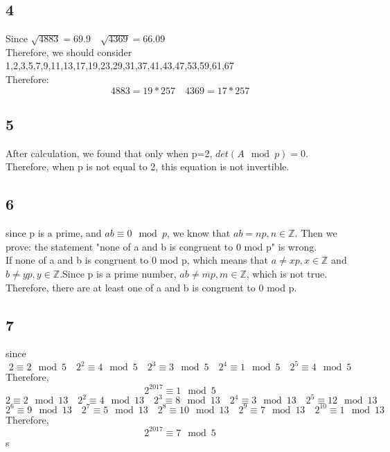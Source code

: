 \documentclass[a4paper,12pt]{journal}
\begin{document}
\subsection*{4}
Since $\sqrt{4883}=69.9\quad\sqrt{4369}=66.09$\\
Therefore, we should consider 1,2,3,5,7,9,11,13,17,19,23,29,31,37,41,43,47,53,59,61,67\\
Therefore:
$$4883=19*257\quad 4369=17*257$$
\subsection*{5}
After calculation, we found that only when p=2, $det(A\mod p)=0$. Therefore, when p is not equal to 2, this equation is not invertible.
\subsection*{6}
since p is a prime, and $ab\equiv 0 \mod p$, we know that $ab=np,n\in\mathbb{Z}$. Then we prove: the statement "none of a and b is congruent to 0 mod p" is wrong.\\
If none of a and b is congruent to 0 mod p, which means that $a\not =xp,x\in\mathbb{Z}$ and $b\not =yp,y\in\mathbb{Z}$.Since p is a prime number, $ab\not = mp,m\in\mathbb{Z}$, which is not true. Therefore, there are at least one of a and b is congruent to 0 mod p.\\
\subsection*{7}
since
$$2\equiv 2\mod 5\quad2^2\equiv 4\mod 5\quad2^3\equiv 3\mod 5\quad2^4\equiv 1\mod 5\quad2^5\equiv 4\mod 5$$
Therefore, $$2^{2017}\equiv 1\mod 5$$
$$2\equiv 2\mod 13\quad2^2\equiv 4\mod 13\quad2^3\equiv 8\mod 13\quad2^4\equiv 3\mod 13\quad2^5\equiv 12\mod 13$$
$$2^6\equiv 9\mod 13\quad2^7\equiv 5\mod 13\quad2^8\equiv 10\mod 13\quad2^9\equiv 7\mod 13\quad2^{10}\equiv 1\mod 13$$
Therefore, $$2^{2017}\equiv 7\mod 5$$
	s
\end{document}
